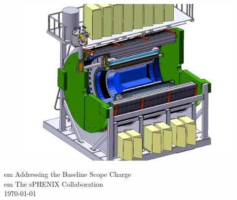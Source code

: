 \renewcommand*\familydefault{\sfdefault}
{\sffamily
\vfill
\vspace{4cm}
\begin{figure}[H]
  \begin{center}
    \includegraphics[width=\linewidth]{figs/sPHENIX}
  \end{center}
\end{figure}

\begin{center}
  \LARGE
   em
  Addressing the Baseline Scope Charge\\
   em
  The sPHENIX Collaboration \\
  \today \\
\end{center}

\vspace{2cm}

\begin{figure}[H]
  \begin{center}
  \end{center}
\end{figure}
}


\vfill
\renewcommand*\familydefault{\rmdefault}
